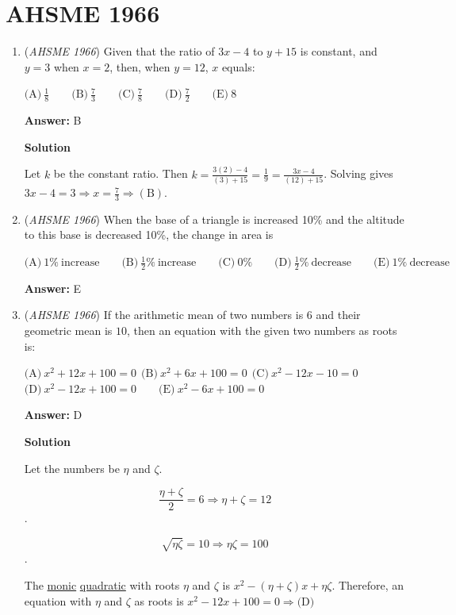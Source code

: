 \section{AHSME 1966}
        \begin{enumerate}
        	\item (\textit{AHSME 1966}) Given that the ratio of $3x - 4$ to $y + 15$ is constant, and $y = 3$ when $x = 2$, then, when $y = 12$, $x$ equals:


 $\text{(A)} \ \frac 18 \qquad \text{(B)} \ \frac 73 \qquad \text{(C)} \ \frac78 \qquad \text{(D)} \ \frac72 \qquad \text{(E)} \ 8$

 \textbf{Answer: }B



\textbf{Solution}

Let $k$ be the constant ratio. Then $k = \frac{3(2)-4}{(3)+15} = \frac{1}{9} = \frac{3x - 4}{(12) + 15}$. Solving gives $3x - 4 = 3 \Longrightarrow x = \frac 73 \Rightarrow \mathrm{(B)}$.

 


	\item (\textit{AHSME 1966}) When the base of a triangle is increased 10\% and the altitude to this base is decreased 10\%, the change in area is 


 $\text{(A)}\ 1\%~\text{increase}\qquad\text{(B)}\ \frac{1}2\%~\text{increase}\qquad\text{(C)}\ 0\%\qquad\text{(D)}\ \frac{1}2\% ~\text{decrease}\qquad\text{(E)}\ 1\% ~\text{decrease}$

 \textbf{Answer: }E


	\item (\textit{AHSME 1966}) If the arithmetic mean of two numbers is $6$ and their geometric mean is $10$, then an equation with the given two numbers as roots is:


 $\text{(A)} \ x^2 + 12x + 100 = 0 ~~ \text{(B)} \ x^2 + 6x + 100 = 0 ~~ \text{(C)} \ x^2 - 12x - 10 = 0$
$\text{(D)} \ x^2 - 12x + 100 = 0 \qquad \text{(E)} \ x^2 - 6x + 100 = 0$

 \textbf{Answer: }D



\textbf{Solution}

Let the numbers be $\eta$ and $\zeta$.

 
 \[\dfrac{\eta+\zeta}{2}=6\Rightarrow \eta+\zeta=12\].

 
 \[\sqrt{\eta\zeta}=10\Rightarrow \eta\zeta=100\].

 The \href{https://artofproblemsolving.com/wiki/index.php?title=Monic\_polynomial}{monic} \href{https://artofproblemsolving.com/wiki/index.php?title=Quadratic}{quadratic} with roots $\eta$ and $\zeta$ is $x^2-(\eta+\zeta)x+\eta\zeta$. Therefore, an equation with $\eta$ and $\zeta$ as roots is $x^2 - 12x + 100 = 0\Rightarrow \text{(D)}$




\end{enumerate}
